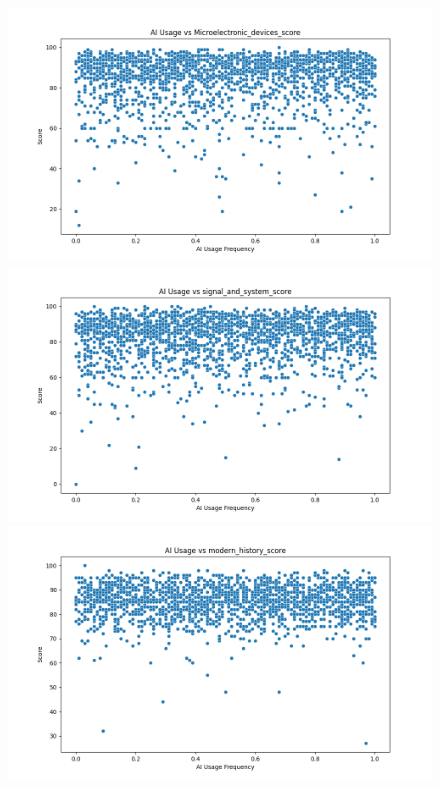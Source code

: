 \documentclass[manuscript,screen,review]{acmart}
\begin{document}
\begin{figure}[H]
    \begin{minipage}{0.3\textwidth}
        \centering
        \includegraphics[width=\linewidth]{../results/Microelectronic_devices_score_ai_correlation.png} %
    \end{minipage}\hfill
    \begin{minipage}{0.3\textwidth}
        \centering
        \includegraphics[width=\linewidth]{../results/signal_and_system_score_ai_correlation.png} %
    \end{minipage}\hfill
    \begin{minipage}{0.3\textwidth}
        \centering
        \includegraphics[width=\linewidth]{../results/modern_history_score_ai_correlation.png} %

\end{minipage}
\end{figure}
\end{document}
